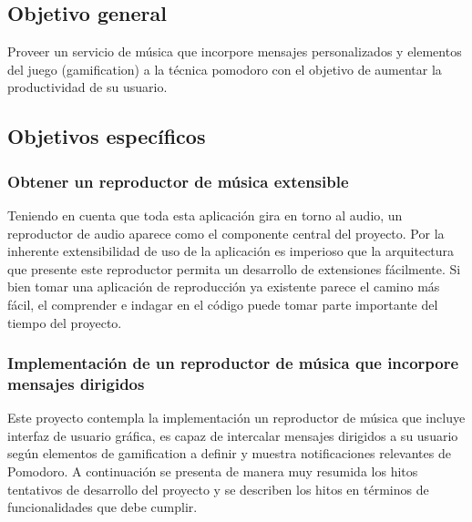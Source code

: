 \documentclass[12pt,letterpaper]{report}
\begin{document}
\hypertarget{objetivo-general}{%
\subsection{Objetivo general}\label{objetivo-general}}

Proveer un servicio de música que incorpore mensajes personalizados y
elementos del juego (gamification) a la técnica pomodoro con el objetivo
de aumentar la productividad de su usuario.

\hypertarget{objetivos-especuxedficos}{%
\subsection{Objetivos específicos}\label{objetivos-especuxedficos}}

\hypertarget{obtener-un-reproductor-de-muxfasica-extensible}{%
\subsubsection{Obtener un reproductor de música
extensible}\label{obtener-un-reproductor-de-muxfasica-extensible}}

Teniendo en cuenta que toda esta aplicación gira en torno al audio, un
reproductor de audio aparece como el componente central del proyecto.
Por la inherente extensibilidad de uso de la aplicación es imperioso que
la arquitectura que presente este reproductor permita un desarrollo de
extensiones fácilmente. Si bien tomar una aplicación de reproducción ya
existente parece el camino más fácil, el comprender e indagar en el
código puede tomar parte importante del tiempo del proyecto.

\hypertarget{implementaciuxf3n-de-un-reproductor-de-muxfasica-que-incorpore-mensajes-dirigidos}{%
\subsubsection{Implementación de un reproductor de música que incorpore
mensajes
dirigidos}\label{implementaciuxf3n-de-un-reproductor-de-muxfasica-que-incorpore-mensajes-dirigidos}}

Este proyecto contempla la implementación un reproductor de música que
incluye interfaz de usuario gráfica, es capaz de intercalar mensajes
dirigidos a su usuario según elementos de gamification a definir y
muestra notificaciones relevantes de Pomodoro. A continuación se
presenta de manera muy resumida los hitos tentativos de desarrollo del
proyecto y se describen los hitos en términos de funcionalidades que
debe cumplir.
\end{document}

